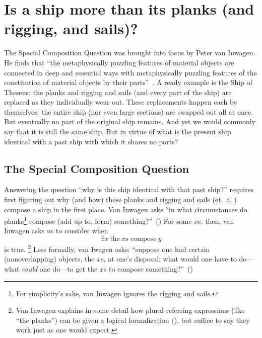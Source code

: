 
\section{Is a ship more than its planks (and rigging, and sails)?}
The Special Composition Question was brought into focus by Peter van Inwagen. He finds that ``the metaphysically puzzling features of material objects are connected in deep and essential ways with metaphysically puzzling features of the constitution of material objects by their parts''~\citep[18]{inwagen1995}. A ready example is the Ship of Theseus: the planks and rigging and sails (and every part of the ship) are replaced as they individually wear out. These replacements happen each by themselves; the entire ship (nor even large sections) are swapped out all at once. But eventually no part of the original ship remains. And yet we would commonly say that it is still the same ship. But in virtue of what is the present ship identical with a past ship with which it shares no parts?

\subsection{The Special Composition Question}
Answering the question ``why is this ship identical with that past ship?'' requires first figuring out why (and how) these planks and rigging and sails (et.\ al.) compose a ship in the first place. Van Inwagen asks ``in what circumstances do planks\footnote{For simplicity's sake, van Inwagen ignores the rigging and sails.} compose (add up to, form) something?''~(\citeyear[21]{inwagen1995}) For some $x$s, then, van Inwagen asks us to consider when
\begin{equation}
\exists x\ \text{the}\ x\text{s compose}\ y
\end{equation}
is true.%
\footnote{Van Inwagen explains in some detail how plural referring expressions (like ``the planks'') can be given a logical formalization (\citeyear[23--28]{inwagen1995}), but suffice to say they work just as one would expect.} %
%
Less formally, van Iwagen asks: ``suppose one had certain (nonoverlapping) objects, the $x$s, at one's disposal; what would one have to do---what {\em could} one do---to get the $x$s to compose something?''~(\citeyear[31]{inwagen1995})

